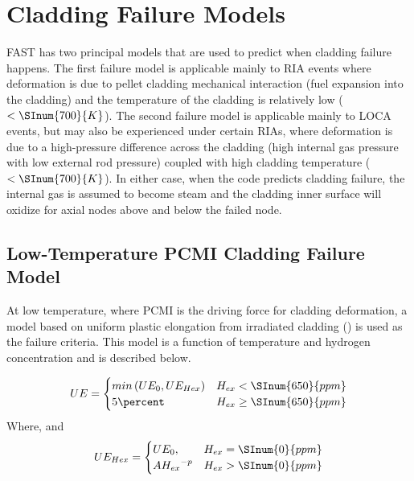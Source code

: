 \section{Cladding Failure Models}\label{section:cladding-failure-models}

FAST has two principal models that are used to predict when cladding failure happens. The first
failure model is applicable mainly to RIA events where deformation is due to pellet cladding
mechanical interaction (fuel expansion into the cladding) and the temperature of the cladding is
relatively low ($<\SInum{700}{K}$). The second failure model is applicable mainly to LOCA events,
but may also be experienced under certain RIAs, where deformation is due to a high-pressure
difference across the cladding (high internal gas pressure with low external rod pressure) coupled
with high cladding temperature ($<\SInum{700}{K}$). In either case, when the code predicts cladding
failure, the internal gas is assumed to become steam and the cladding inner surface will oxidize for
axial nodes  above and below the failed node.

\subsection{Low-Temperature PCMI Cladding Failure Model}\label{section:low-temperature-pcmi-cladding-failure-model}

At low temperature, where PCMI is the driving force for cladding deformation, a model based on
uniform plastic elongation from irradiated cladding (\cite{ref:Geelhood2008a}) is
used as the failure criteria. This model is a function of temperature and hydrogen concentration and
is described below.

\begin{equation}
    \label{eq:uniform_elongation_excess_hydrogen_Zirc}
    UE =  
    \begin{cases}
        min\left( UE_{0},UE_{Hex} \right)       & H_{ex} < \SInum{650}{ppm}   \\
        5\percent                               & H_{ex} \geq \SInum{650}{ppm} 
    \end{cases}
\end{equation}
Where,
and
\begin{equation}
    UE_{Hex} =
    \begin{cases}
        UE_{0},                     &  H_{ex} = \SInum{0}{ppm} \\
        A{H_{ex}}^{- p}             &  H_{ex} > \SInum{0}{ppm} 
    \end{cases}
\end{equation}

